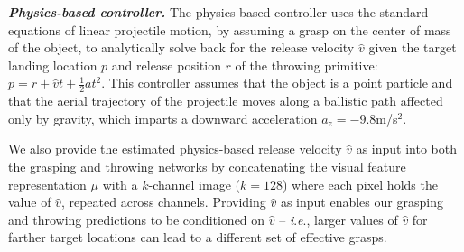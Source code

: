 \documentclass[journal]{IEEEtran}
\newcommand{\ie}{\textit{i}.\textit{e}., }
\newcommand{\eg}{\textit{e}.\textit{g}. }
\newcommand{\mypara}[1]{\par\vspace*{0.8mm}\noindent\textbf{\textit{#1}}}
\begin{document}


\mypara{Physics-based controller.} The physics-based controller uses the standard equations of linear projectile motion, by assuming a grasp on the center of mass of the object, to analytically solve back for the release velocity $\hat{v}$ given the target landing location $p$ and release position $r$ of the throwing primitive:
$p=r+\hat{v}t+\frac{1}{2}at^{2}$.
\noindent This controller assumes that the object is a point particle and that the aerial trajectory of the projectile moves along a ballistic path affected only by gravity, which imparts a downward acceleration $a_z=-9.8$m/s$^{2}$. 

We also provide the estimated physics-based release velocity $\hat{v}$ as input into both the grasping and throwing networks by concatenating the visual feature representation $\mu$ with a $k$-channel image ($k=128$) where each pixel holds the value of $\hat{v}$, repeated across channels. Providing $\hat{v}$ as input enables our grasping and throwing predictions to be conditioned on $\hat{v}$ -- \ie larger values of $\hat{v}$ for farther target locations can lead to a different set of effective grasps.
\end{document}
